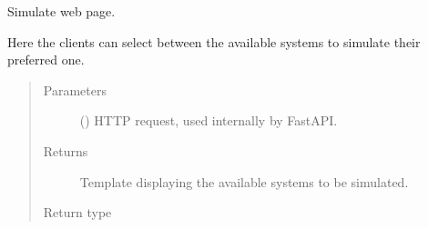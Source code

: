 \documentclass[a4paper,landscape,10pt,english]{sphinxmanual}
\begin{document}

\begin{fulllineitems}
\label{\detokenize{code_docs/simulation_api.controller:simulation_api.controller.main.simulate}}
Simulate web page.

Here the clients can select between the available systems to simulate their
preferred one.
\begin{quote}\begin{description}
\item[{Parameters}] \leavevmode
{} () \textendash{} HTTP request, used internally by FastAPI.

\item[{Returns}] \leavevmode
Template displaying the available systems to be simulated.

\item[{Return type}] \leavevmode
{}

\end{description}\end{quote}

\end{fulllineitems}

\end{document}
